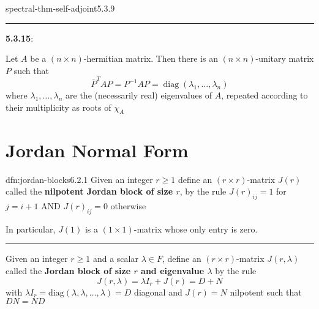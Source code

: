 \documentclass[landscape, 8pt]{extarticle}
\DeclareMathOperator{\Mat}{Mat}
\DeclareMathOperator{\diag}{diag}
\begin{document}
\begin{multicols}{3}
\begin{thm}{spectral-thm-self-adjoint}{5.3.9}
    \noindent\rule{\textwidth}{0.2pt}
    \textbf{5.3.15}: \underline{}

    Let $A$ be a $(n \times n)$-hermitian matrix. Then there is an $(n \times n)$-unitary matrix $P$ such that
    \[\overline{P}^{T} A P = P^{-1}AP = \diag(\lambda_{1},\dots,\lambda_{n})\]
    where $\lambda_{1},\dots,\lambda_{n}$ are the (necessarily real) eigenvalues of $A$, repeated according to their multiplicity as roots of $\chi_{A}$
\end{thm}

\vspace{-12pt}
\section{Jordan Normal Form}


\begin{dfn}{dfn:jordan-blocks}{6.2.1}
    \vspace{-5pt}
    Given an integer $r \ge 1$ define an $(r \times r)$-matrix $J(r)$ called the \textbf{nilpotent Jordan block of size $r$}, by the rule $J(r)_{ij} = 1$ for $j = i + 1$ AND $J(r)_{ij} = 0$ otherwise

    In particular, $J(1)$ is a $(1 \times 1)$-matrix whose only entry is zero.

    \noindent\rule{\textwidth}{0.2pt}
    Given an integer $r \ge 1$ and a scalar $\lambda\in F$, define an $(r \times r)$-matrix $J(r, \lambda)$ called the \textbf{Jordan block of size $r$ and eigenvalue $\lambda$} by the rule
    \[J(r, \lambda) = \lambda I_{r} + J(r) = D + N\]
    with $\lambda I_{r} = \text{diag}(\lambda, \lambda,\dots, \lambda) = D$ diagonal and $J(r) = N$ nilpotent such that $DN = ND$
\end{dfn}


\end{multicols}
\end{document}
